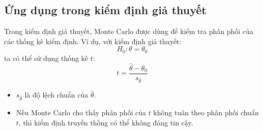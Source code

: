 \subsection{Ứng dụng trong kiểm định giả thuyết}
Trong kiểm định giả thuyết, Monte Carlo được dùng để kiểm tra phân phối của các thống kê kiểm định.
Ví dụ, với kiểm định giả thuyết:
\begin{equation}
    H_0: \theta = \theta_0
\end{equation}
ta có thể sử dụng thống kê $t$:
\begin{equation}
    t = \frac{\hat{\theta} - \theta_0}{s_{\hat{\theta}}}
\end{equation}
\begin{itemize}
    \item $s_{\hat{\theta}}$ là độ lệch chuẩn của $\hat{\theta}$.
    \item Nếu Monte Carlo cho thấy phân phối của $t$ không tuân theo phân phối chuẩn $t$, thì kiểm định truyền thống có thể không đáng tin cậy.
\end{itemize}
